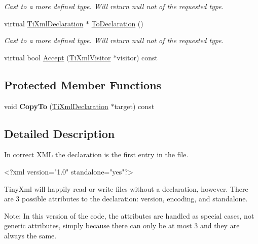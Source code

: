 \begin{DoxyCompactItemize}
\begin{DoxyCompactList}\small\item\em \-Cast to a more defined type. \-Will return null not of the requested type. \end{DoxyCompactList}\item 
\hypertarget{classTiXmlDeclaration_a6bd3d1daddcaeb9543c24bfd090969ce}{
virtual \hyperlink{classTiXmlDeclaration}{\-Ti\-Xml\-Declaration} $\ast$ \hyperlink{classTiXmlDeclaration_a6bd3d1daddcaeb9543c24bfd090969ce}{\-To\-Declaration} ()}
\label{d2/df2/classTiXmlDeclaration_a6bd3d1daddcaeb9543c24bfd090969ce}

\begin{DoxyCompactList}\small\item\em \-Cast to a more defined type. \-Will return null not of the requested type. \end{DoxyCompactList}\item 
virtual bool \hyperlink{classTiXmlDeclaration_ab6a6b178161ba9abc2c35058de689864}{\-Accept} (\hyperlink{classTiXmlVisitor}{\-Ti\-Xml\-Visitor} $\ast$visitor) const 
\end{DoxyCompactItemize}
\subsection*{\-Protected \-Member \-Functions}
\begin{DoxyCompactItemize}
\item 
\hypertarget{classTiXmlDeclaration_a9d08959f935421a593032bd3efb30c38}{
void {\bfseries \-Copy\-To} (\hyperlink{classTiXmlDeclaration}{\-Ti\-Xml\-Declaration} $\ast$target) const }
\label{d2/df2/classTiXmlDeclaration_a9d08959f935421a593032bd3efb30c38}

\end{DoxyCompactItemize}


\subsection{\-Detailed \-Description}
\-In correct \-X\-M\-L the declaration is the first entry in the file. \begin{DoxyVerb}
		<?xml version="1.0" standalone="yes"?>
	\end{DoxyVerb}


\-Tiny\-Xml will happily read or write files without a declaration, however. \-There are 3 possible attributes to the declaration\-: version, encoding, and standalone.

\-Note\-: \-In this version of the code, the attributes are handled as special cases, not generic attributes, simply because there can only be at most 3 and they are always the same. 

